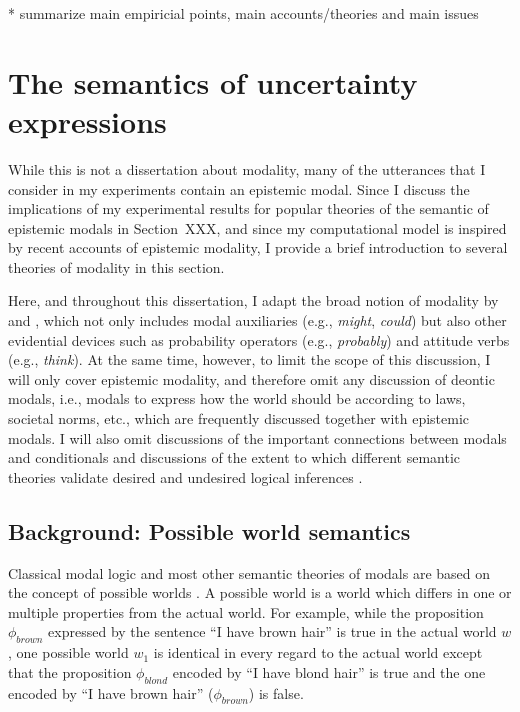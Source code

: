 * summarize main empiricial points, main accounts/theories  and main issues


\section{The semantics of uncertainty expressions}

While this is not a dissertation about modality, many of the utterances that I consider in my experiments contain an epistemic modal.
Since I discuss the implications of my experimental results for popular theories of the semantic of epistemic modals in Section~{XXX}, and since 
my computational model is inspired by recent accounts of epistemic modality, I provide a brief introduction to several theories of modality in this section.

Here, and throughout this dissertation, I adapt the broad notion of modality by \cite{Portner2009} and \cite{Kratzer2012Ch2}, which not only 
includes modal auxiliaries (e.g., \textit{might}, \textit{could}) but also other evidential devices such as probability operators 
(e.g., \textit{probably}) and attitude verbs (e.g., \textit{think}). At the same time, however, to limit the scope of this discussion,  
I will only cover epistemic modality, and therefore omit any discussion of deontic modals, i.e., modals to express how the 
world should be according to laws, societal norms, etc., which are frequently discussed together with epistemic modals.
I will also omit discussions of the important connections between modals and conditionals \cite{see e.g., Lewis1973?,Kratzer1978,Kratzer1979,Kratzer2012}
and discussions of the extent to which different semantic theories validate desired and undesired logical inferences \cite{see e.g., Yalcin2010}.

\subsection{Background: Possible world semantics}

Classical modal logic and most other semantic theories of modals are based on the concept of possible worlds \cite{kripke1963}.
A possible world is a world which differs in one or multiple properties from the actual world. For example, while the proposition $\phi_{brown}$
expressed by the  sentence ``I have brown hair'' is true in the actual world $w$, one possible world $w_1$ is identical in every regard to 
the actual world except that the proposition $\phi_{blond}$ encoded by ``I have blond hair'' is true and the one encoded by
``I have brown hair'' ($\phi_{brown}$) is false. 

